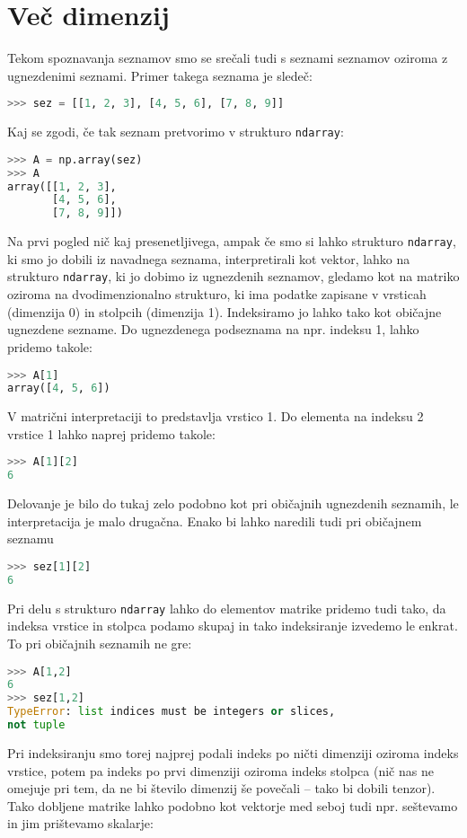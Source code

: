 \section{Več dimenzij}

Tekom spoznavanja seznamov smo se srečali tudi s seznami seznamov oziroma z ugnezdenimi seznami. Primer takega seznama je sledeč:
\begin{lstlisting}[language=Python]
>>> sez = [[1, 2, 3], [4, 5, 6], [7, 8, 9]]
\end{lstlisting}
Kaj se zgodi, če tak seznam pretvorimo v strukturo \texttt{ndarray}:
\begin{lstlisting}[language=Python]
>>> A = np.array(sez)
>>> A
array([[1, 2, 3],
       [4, 5, 6],
       [7, 8, 9]])
\end{lstlisting}
Na prvi pogled nič kaj presenetljivega, ampak če smo si lahko strukturo \texttt{ndarray}, ki smo jo dobili iz navadnega seznama, interpretirali kot vektor, lahko na strukturo \texttt{ndarray}, ki jo dobimo iz ugnezdenih seznamov, gledamo kot na matriko oziroma na dvodimenzionalno strukturo, ki ima podatke zapisane v vrsticah (dimenzija 0) in stolpcih (dimenzija 1). Indeksiramo jo lahko tako kot običajne ugnezdene sezname. Do ugnezdenega podseznama na npr. indeksu 1, lahko pridemo takole:
\begin{lstlisting}[language=Python]
>>> A[1]
array([4, 5, 6])
\end{lstlisting}
V matrični interpretaciji to predstavlja vrstico 1. Do elementa na indeksu 2 vrstice 1 lahko naprej pridemo takole:
\begin{lstlisting}[language=Python]
>>> A[1][2]
6
\end{lstlisting}
Delovanje je bilo do tukaj zelo podobno kot pri običajnih ugnezdenih seznamih, le interpretacija je malo drugačna. Enako bi lahko naredili tudi pri običajnem seznamu
\begin{lstlisting}[language=Python]
>>> sez[1][2]
6
\end{lstlisting}
Pri delu s strukturo \texttt{ndarray} lahko do elementov matrike pridemo tudi tako, da indeksa vrstice in stolpca podamo skupaj in tako indeksiranje izvedemo le enkrat. To pri običajnih seznamih ne gre:
\begin{lstlisting}[language=Python]
>>> A[1,2]
6
>>> sez[1,2]
TypeError: list indices must be integers or slices, 
not tuple
\end{lstlisting}
Pri indeksiranju smo torej najprej podali indeks po ničti dimenziji oziroma indeks vrstice, potem pa indeks po prvi dimenziji oziroma indeks stolpca (nič nas ne omejuje pri tem, da ne bi število dimenzij še povečali -- tako bi dobili tenzor). Tako dobljene matrike lahko podobno kot vektorje med seboj tudi npr. seštevamo in jim prištevamo skalarje:
